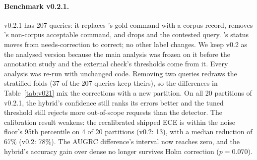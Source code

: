 \paragraph{Benchmark v0.2.1.} v0.2.1 has 207 queries: it replaces 's gold command with a corpus record,
removes 's non-corpus acceptable command, and drops  and the contested query. 's status
moves from needs-correction to correct; no other label changes. We keep v0.2 as the analysed version because the
main analysis was frozen on it before the annotation study and the external check's thresholds come from it.
Every analysis was re-run with unchanged code. Removing two queries redraws the stratified folds (37 of the 207
queries keep theirs), so the differences in Table~\ref{tab:v021} mix the corrections with a new partition. On all 20
partitions of v0.2.1, the hybrid's confidence still ranks its errors better and the tuned threshold still rejects
more out-of-scope requests than the detector. The calibration result weakens: the recalibrated shipped ECE is within
the noise floor's 95th percentile on 4 of 20 partitions (v0.2: 13), with a median reduction of 67\% (v0.2: 78\%).
The AUGRC difference's interval now reaches zero, and the hybrid's accuracy gain over dense no longer survives Holm
correction ($p=0.070$).

